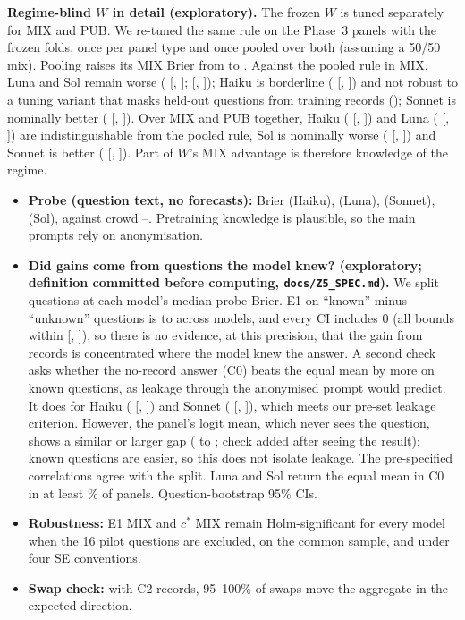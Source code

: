 \documentclass[11pt,letterpaper]{article}
\newcommand{\cstar}{c^{*}}
\begin{document}
\textbf{Regime-blind $W$ in detail (exploratory).} The frozen $W$ is tuned separately for MIX and PUB. We re-tuned the same rule on the
Phase~3 panels with the frozen folds, once per panel type and once pooled over both (assuming a 50/50 mix). Pooling
raises its MIX Brier from \typedWBrier{} to \pooledWBrier. Against the pooled rule in MIX, Luna and Sol remain worse
(\pooledWLuna{} [\pooledWLoLuna, \pooledWHiLuna]; \pooledWSol{} [\pooledWLoSol, \pooledWHiSol]); Haiku is borderline
(\pooledWHaiku{} [\pooledWLoHaiku, \pooledWHiHaiku]) and not robust to a tuning variant that masks held-out questions
from training records (\pooledWMaskedHaiku); Sonnet is nominally better (\pooledWSonnet{} [\pooledWLoSonnet,
\pooledWHiSonnet]). Over MIX and PUB together, Haiku (\pooledWAllHaiku{} [\pooledWAllLoHaiku, \pooledWAllHiHaiku]) and
Luna (\pooledWAllLuna{} [\pooledWAllLoLuna, \pooledWAllHiLuna]) are indistinguishable from the pooled rule, Sol is
nominally worse (\pooledWAllSol{} [\pooledWAllLoSol, \pooledWAllHiSol]) and Sonnet is better (\pooledWAllSonnet{}
[\pooledWAllLoSonnet, \pooledWAllHiSonnet]). Part of $W$'s MIX advantage is therefore knowledge of the regime.

\begin{itemize}
\item \textbf{Probe (question text, no forecasts):} Brier \probeHaiku{} (Haiku), \probeLuna{} (Luna), \probeSonnet{}
  (Sonnet), \probeSol{} (Sol), against crowd \probeCrowdLo--\probeCrowdHi. Pretraining knowledge is plausible, so the
  main prompts rely on anonymisation.
\item \textbf{Did gains come from questions the model knew? (exploratory; definition committed before computing,
  \texttt{docs/Z5\_SPEC.md}).} We split questions at each model's median probe Brier. E1 on ``known'' minus
  ``unknown'' questions is \zfiveAMin{} to \zfiveAMax{} across models, and every CI includes 0 (all
  bounds within [\zfiveALoMin, \zfiveAHiMax]), so there is no evidence, at this precision, that the gain from records is
  concentrated where the model knew the answer.
  A second check asks whether the no-record answer (C0) beats the equal mean by more on known questions, as leakage
  through the anonymised prompt would predict. It does for Haiku (\zfiveBHaiku{} [\zfiveBLoHaiku, \zfiveBHiHaiku])
  and Sonnet (\zfiveBSonnet{} [\zfiveBLoSonnet, \zfiveBHiSonnet]), which meets our pre-set leakage criterion.
  However, the panel's logit mean, which never sees the question, shows a similar or larger gap (\zfiveXMin{} to
  \zfiveXMax; check added after seeing the result): known questions are easier, so this does not isolate leakage.
  The pre-specified correlations agree with the split. Luna and Sol return the equal mean in C0 in at
  least \zfiveEqMean\% of panels. Question-bootstrap 95\% CIs.
\item \textbf{Robustness:} E1 MIX and $\cstar$ MIX remain Holm-significant for every model when the 16 pilot questions
  are excluded, on the common sample, and under four SE conventions.
\item \textbf{Swap check:} with C2 records, 95--100\% of swaps move the aggregate in the expected direction.
\end{itemize}
\end{document}
